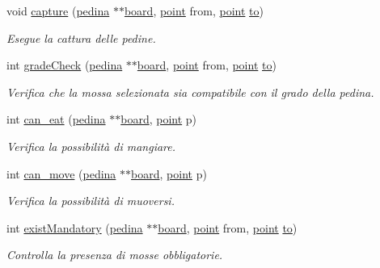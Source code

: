 \begin{DoxyCompactItemize}
void \hyperlink{group__Logiche_ga373ce247f8d712b22dd6db6b5aaeb77c}{capture} (\hyperlink{ml__lib_8h_a71fee95122b31f5cb0b07d9c16ffa3a5}{pedina} $\ast$$\ast$\hyperlink{ml__main_8c_a62a3fe3d1df9ff58883b669f7f24e516}{board}, \hyperlink{structpunto}{point} from, \hyperlink{structpunto}{point} \hyperlink{ml__main_8c_a35ca515c701098a8cb38f9ef83404198}{to})
\begin{DoxyCompactList}\small\item\em Esegue la cattura delle pedine. \end{DoxyCompactList}\item 
int \hyperlink{group__Logiche_ga92e065216878c6972f25bb40cede5a3f}{grade\+Check} (\hyperlink{ml__lib_8h_a71fee95122b31f5cb0b07d9c16ffa3a5}{pedina} $\ast$$\ast$\hyperlink{ml__main_8c_a62a3fe3d1df9ff58883b669f7f24e516}{board}, \hyperlink{structpunto}{point} from, \hyperlink{structpunto}{point} \hyperlink{ml__main_8c_a35ca515c701098a8cb38f9ef83404198}{to})
\begin{DoxyCompactList}\small\item\em Verifica che la mossa selezionata sia compatibile con il grado della pedina. \end{DoxyCompactList}\item 
int \hyperlink{group__Logiche_gae47a85e51124bf1b5569559ba5718bb6}{can\+\_\+eat} (\hyperlink{ml__lib_8h_a71fee95122b31f5cb0b07d9c16ffa3a5}{pedina} $\ast$$\ast$\hyperlink{ml__main_8c_a62a3fe3d1df9ff58883b669f7f24e516}{board}, \hyperlink{structpunto}{point} p)
\begin{DoxyCompactList}\small\item\em Verifica la possibilità di mangiare. \end{DoxyCompactList}\item 
int \hyperlink{group__Logiche_ga8cc7e93c7f87a22d21412b3ca1f942e6}{can\+\_\+move} (\hyperlink{ml__lib_8h_a71fee95122b31f5cb0b07d9c16ffa3a5}{pedina} $\ast$$\ast$\hyperlink{ml__main_8c_a62a3fe3d1df9ff58883b669f7f24e516}{board}, \hyperlink{structpunto}{point} p)
\begin{DoxyCompactList}\small\item\em Verifica la possibilità di muoversi. \end{DoxyCompactList}\item 
int \hyperlink{group__Logiche_gaf5deae59415fab0cf7de74362d4b56e6}{exist\+Mandatory} (\hyperlink{ml__lib_8h_a71fee95122b31f5cb0b07d9c16ffa3a5}{pedina} $\ast$$\ast$\hyperlink{ml__main_8c_a62a3fe3d1df9ff58883b669f7f24e516}{board}, \hyperlink{structpunto}{point} from, \hyperlink{structpunto}{point} \hyperlink{ml__main_8c_a35ca515c701098a8cb38f9ef83404198}{to})
\begin{DoxyCompactList}\small\item\em Controlla la presenza di mosse obbligatorie. \end{DoxyCompactList}\end{DoxyCompactItemize}


